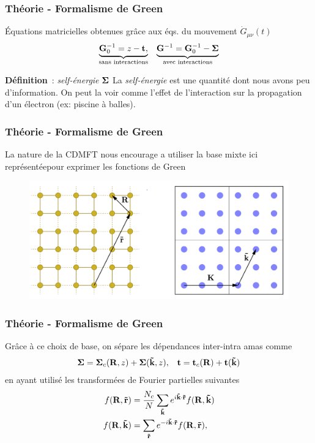 \begin{frame}
    \frametitle{Théorie - Formalisme de Green}
    Équations matricielles obtenues grâce aux éqs. du mouvement $\dot{G}_{\mu\nu}(t)$
    \begin{align}
      \underbrace{\vb{G}_0^{-1} = z - \vb{t},}_{\text{sans interactions}}
        &&\underbrace{\vb{G}^{-1} = \vb{G}_0^{-1} - \vb{\Sigma}}_{\text{avec interactions}}
        \label{eq: greens}
    \end{align}
    \vfill
    \pause
    \begin{mybrownbox}{\textbf{Définition}~: \textit{self-énergie} $\vb{\Sigma}$}
      La \textit{self-énergie} est une quantité dont nous avons peu d'information.
      On peut la voir comme l'effet de l'interaction sur la propagation d'un électron
      (ex: piscine à balles).
    \end{mybrownbox}
\end{frame}

\begin{frame}
    \frametitle{Théorie - Formalisme de Green}
    La nature de la CDMFT nous encourage a utiliser la base mixte ici
    représentée\footnotemark pour exprimer les fonctions de Green
    \begin{figure}
      \centering
      \includegraphics[scale=0.25]{./figures/theory/mixed_basis.png}
    \end{figure}
\end{frame}

\begin{frame}
    \frametitle{Théorie - Formalisme de Green}
    Grâce à ce choix de base, on sépare les dépendances inter-intra amas comme
    \begin{align*}
        \vb{\Sigma} = \vb{\Sigma}_c(\vb{R}, z) + \vb{\Sigma}(\vb{\tilde{k}}, z),
        &&\vb{t} = \vb{t}_c(\vb{R}) + \vb{t}(\vb{\tilde{k}})
    \end{align*}
    \vfill
    \pause
    en ayant utilisé les transformées de Fourier partielles suivantes
    \begin{align}
      f(\vb{R}, \vb{\Tilde{r}}) &= \frac{N_c}{N}\sum_{\vb{\Tilde{k}}}e^{i\vb{\Tilde{k}}\cdot\vb{\Tilde{r}}}f(\vb{R}, \vb{\Tilde{k}})\\
      f(\vb{R}, \vb{\Tilde{k}}) &= \sum_{\vb{\Tilde{r}}}e^{-i\vb{\Tilde{k}}\cdot\vb{\Tilde{r}}}f(\vb{R}, \vb{\Tilde{r}}),
      \label{eq: partial_fourier}
    \end{align}
\end{frame}
